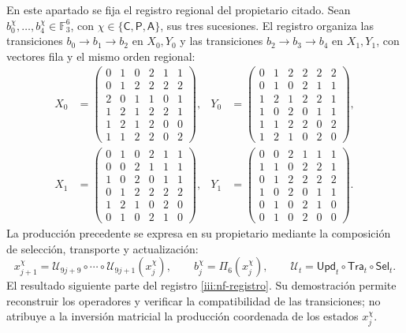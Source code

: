 En este apartado se fija el registro regional del propietario citado.
Sean $b_0^\chi,\ldots,b_4^\chi\in\mathbb F_3^6$, con
$\chi\in\{\mathsf C,\mathsf P,\mathsf A\}$, sus tres sucesiones.
El registro organiza las transiciones $b_0\to b_1\to b_2$ en
$X_0,Y_0$ y las transiciones $b_2\to b_3\to b_4$ en $X_1,Y_1$,
con vectores fila y el mismo orden regional:
\begingroup\small
\begin{equation}
\begin{aligned}
X_0&=\begin{pmatrix}
0&1&0&2&1&1\\0&1&2&2&2&2\\2&0&1&1&0&1\\
1&2&1&2&2&1\\1&2&1&2&0&0\\1&1&2&2&0&2
\end{pmatrix},&
Y_0&=\begin{pmatrix}
0&1&2&2&2&2\\0&1&0&2&1&1\\1&2&1&2&2&1\\
1&0&2&0&1&1\\1&1&2&2&0&2\\1&2&1&0&2&0
\end{pmatrix},\\[1ex]
X_1&=\begin{pmatrix}
0&1&0&2&1&1\\0&0&2&1&1&1\\1&0&2&0&1&1\\
0&1&2&2&2&2\\1&2&1&0&2&0\\0&1&0&2&1&0
\end{pmatrix},&
Y_1&=\begin{pmatrix}
0&0&2&1&1&1\\1&1&0&2&2&1\\0&1&2&2&2&2\\
1&0&2&0&1&1\\0&1&0&2&1&0\\0&1&0&2&0&0
\end{pmatrix}.
\end{aligned}
\label{iii:nf-registro}
\end{equation}
\endgroup
La producción precedente se expresa en su propietario mediante la
composición de selección, transporte y actualización:
\[
 x_{j+1}^{\chi}
 =\mathcal U_{9j+9}\circ\cdots\circ\mathcal U_{9j+1}(x_j^{\chi}),
 \qquad b_j^\chi=\Pi_6(x_j^\chi),
 \qquad\mathcal U_t=\mathsf{Upd}_t\circ\mathsf{Tra}_t\circ\mathsf{Sel}_t.
\]
El resultado siguiente parte del registro \eqref{iii:nf-registro}.
Su demostración permite reconstruir los operadores y verificar la
compatibilidad de las transiciones; no atribuye a la inversión matricial
la producción coordenada de los estados $x_j^\chi$.

